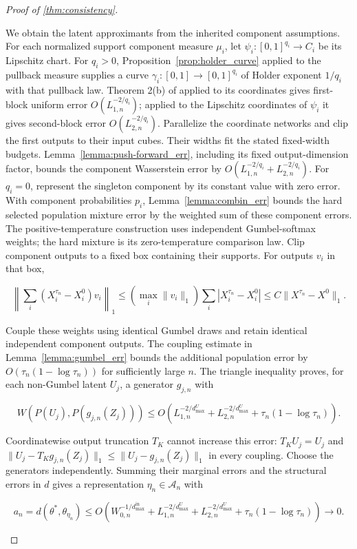 \begin{proof}[Proof of \cref{thm:consistency}]
\begin{enumerate}
We obtain the latent approximants from the inherited component assumptions. For each normalized support component measure $\mu_i$, let $\psi_i:[0,1]^{q_i}\rightarrow C_i$ be its Lipschitz chart. For $q_i>0$, Proposition~\ref{prop:holder_curve} applied to the pullback measure supplies a curve $\gamma_i:[0,1]\rightarrow[0,1]^{q_i}$ of Holder exponent $1/q_i$ with that pullback law. Theorem 2(b) of \cite{Yarotsky2018OptimalAO} applied to its coordinates gives first-block uniform error $O(L_{1,n}^{-2/q_i})$; applied to the Lipschitz coordinates of $\psi_i$ it gives second-block error $O(L_{2,n}^{-2/q_i})$. Parallelize the coordinate networks and clip the first outputs to their input cubes. Their widths fit the stated fixed-width budgets. Lemma~\ref{lemma:push-forward_err}, including its fixed output-dimension factor, bounds the component Wasserstein error by $O(L_{1,n}^{-2/q_i}+L_{2,n}^{-2/q_i})$. For $q_i=0$, represent the singleton component by its constant value with zero error. With component probabilities $p_i$, Lemma~\ref{lemma:combin_err} bounds the hard selected population mixture error by the weighted sum of these component errors. The positive-temperature construction uses independent Gumbel-softmax weights; the hard mixture is its zero-temperature comparison law. Clip component outputs to a fixed box containing their supports. For outputs $v_i$ in that box,

\[
\left\|\sum_i(X_i^{\tau_n}-X_i^0)v_i\right\|_1\leqslant\left(\max_i\|v_i\|_1\right)\sum_i|X_i^{\tau_n}-X_i^0|\leqslant C\|X^{\tau_n}-X^0\|_1.
\]

Couple these weights using identical Gumbel draws and retain identical independent component outputs. The coupling estimate in Lemma~\ref{lemma:gumbel_err} bounds the additional population error by $O(\tau_n(1-\log\tau_n))$ for sufficiently large $n$. The triangle inequality proves, for each non-Gumbel latent $U_j$, a generator $g_{j,n}$ with

\[
W(P(U_j),P(g_{j,n}(Z_j)))\leqslant O\left(L_{1,n}^{-2/d_{\max}^U}+L_{2,n}^{-2/d_{\max}^U}+\tau_n(1-\log\tau_n)\right).
\]

Coordinatewise output truncation $T_K$ cannot increase this error: $T_KU_j=U_j$ and $\|U_j-T_Kg_{j,n}(Z_j)\|_1\leqslant\|U_j-g_{j,n}(Z_j)\|_1$ in every coupling. Choose the generators independently. Summing their marginal errors and the structural errors in $d$ gives a representation $\eta_n\in\mathcal A_n$ with

\[
a_n=d(\theta^*,\theta_{\eta_n})\leqslant O\left(W_{0,n}^{-1/d_{\max}^{\text{in}}}+L_{1,n}^{-2/d_{\max}^U}+L_{2,n}^{-2/d_{\max}^U}+\tau_n(1-\log\tau_n)\right)\rightarrow0.
\]


\end{enumerate}
\end{proof}
